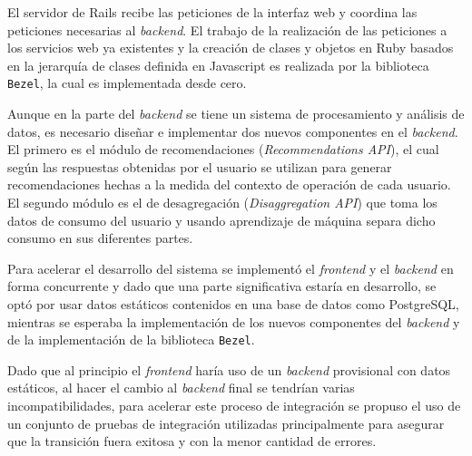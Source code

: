 El servidor de Rails recibe las peticiones de la interfaz web y
coordina las peticiones necesarias al \textit{backend}. El trabajo
de la realización de las peticiones a los servicios web ya existentes
y la creación de clases y objetos en Ruby basados en la jerarquía de clases
definida en Javascript es realizada por la biblioteca \texttt{Bezel},
la cual es implementada desde cero.

Aunque en la parte del \textit{backend} se tiene un sistema de procesamiento
y análisis de datos, es necesario diseñar e implementar dos nuevos componentes
en el \textit{backend}. El primero es el módulo de recomendaciones
(\textit{Recommendations API}), el cual según las respuestas obtenidas por el
usuario se utilizan para generar recomendaciones hechas a la medida del
contexto de operación de cada usuario. El segundo módulo es el de
desagregación (\textit{Disaggregation API}) que toma los datos de consumo
del usuario y usando aprendizaje de máquina separa dicho consumo en sus
diferentes partes.

Para acelerar el desarrollo del sistema se implementó el \textit{frontend}
y el \textit{backend} en forma concurrente y dado que una parte significativa
estaría en desarrollo, se optó por usar datos estáticos contenidos
en una base de datos como PostgreSQL, mientras se esperaba la implementación
de los nuevos componentes del \textit{backend} y de la implementación de la
biblioteca \texttt{Bezel}.

Dado que al principio el \textit{frontend} haría uso de un \textit{backend}
provisional con datos estáticos, al hacer el cambio al \textit{backend} final
se tendrían varias incompatibilidades, para acelerar este proceso de integración
se propuso el uso de un conjunto de pruebas de integración utilizadas
principalmente para asegurar que la transición fuera exitosa y con la menor
cantidad de errores.


